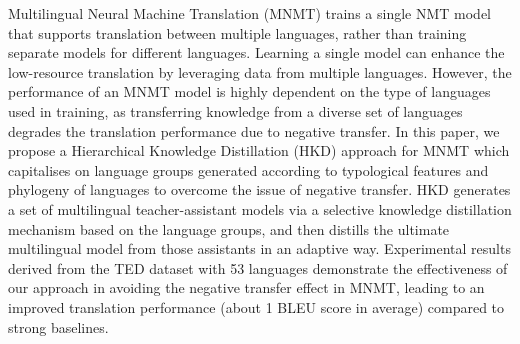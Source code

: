 Multilingual Neural Machine Translation (MNMT) trains a single NMT model that supports translation between multiple languages, rather than training separate models for different languages. Learning a single model can enhance the low-resource translation by leveraging data from multiple languages. However, the performance of an MNMT model is highly dependent on the type of languages used in training, as transferring knowledge from a diverse set of languages degrades the translation performance due to negative transfer. In this paper, we propose a Hierarchical Knowledge Distillation (HKD) approach for MNMT which capitalises on language groups generated according to typological features and phylogeny of languages to overcome the issue of negative transfer. HKD generates a set of multilingual teacher-assistant models via a selective knowledge distillation mechanism based on the language groups, and then distills the ultimate multilingual model from those assistants in an adaptive way. Experimental results derived from the TED dataset with 53 languages demonstrate the effectiveness of our approach in avoiding the negative transfer effect in MNMT, leading to an improved translation performance (about 1 BLEU score in average) compared to strong baselines.
